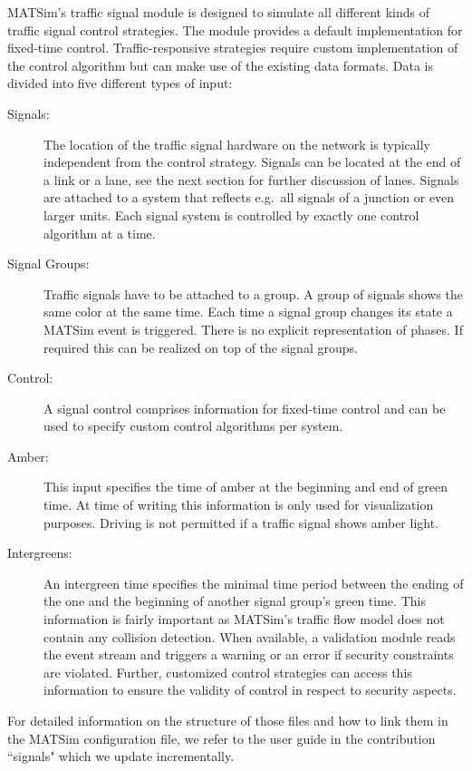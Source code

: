 MATSim's traffic signal module is designed to simulate all different kinds of traffic signal control strategies. 
The module provides a default implementation for fixed-time control. 
Traffic-responsive strategies require custom implementation of the control algorithm but can make use of the existing data formats. 
Data is divided into five different types of input:
\begin{description}
	\item[Signals:] The location of the traffic signal hardware on the network is typically independent from the control strategy. Signals can be located at the end of a link or a lane, see the next section for further discussion of lanes. Signals are attached to a system that reflects e.g.~all signals of a junction or even larger units. Each signal system is controlled by exactly one control algorithm at a time.  
	\item[Signal Groups:] Traffic signals have to be attached to a group. A group of signals shows the same color at the same time. Each time a signal group changes its state a MATSim event is triggered. 
		There is no explicit representation of phases. If required this can be realized on top of the signal groups.  
	\item[Control:] A signal control comprises information for fixed-time control and can be used to specify custom control algorithms per system. 
	\item[Amber:] This input specifies the time of amber at the beginning and end of green time. At time of writing this information is only used for visualization purposes. 
		Driving is not permitted if a traffic signal shows amber light. 
	\item[Intergreens:] An intergreen time specifies the minimal time period between the ending of the one and the beginning of another signal group's green time.  
		This information is fairly important as MATSim's traffic flow model does not contain any collision detection. 
		When available, a validation module reads the event stream and triggers a warning or an error if security constraints are violated. 
		Further, customized control strategies can access this information to ensure the validity of control in respect to security aspects.    
\end{description}

For detailed information on the structure of those files and how to link them in the MATSim configuration file, we refer to the user guide in the contribution ``signals" which we update incrementally.

